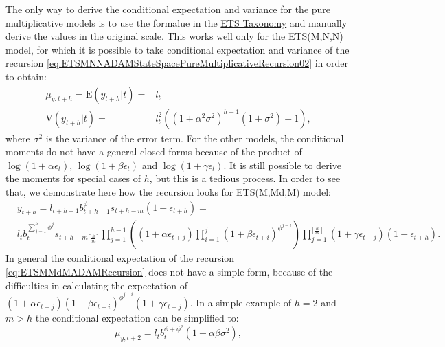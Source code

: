 \documentclass[
]{book}
\theoremstyle{definition}
\theoremstyle{definition}
\theoremstyle{definition}
\theoremstyle{definition}
\theoremstyle{remark}
\begin{document}
The only way to derive the conditional expectation and variance for the pure multiplicative models is to use the formalue in the \protect\hyperlink{ETSTaxonomyMaths}{ETS Taxonomy} and manually derive the values in the original scale. This works well only for the ETS(M,N,N) model, for which it is possible to take conditional expectation and variance of the recursion \eqref{eq:ETSMNNADAMStateSpacePureMultiplicativeRecursion02} in order to obtain:
\begin{equation}
    \begin{aligned}
        \mu_{y,t+h} = \mathrm{E}(y_{t+h}|t) = & l_{t} \\
        \mathrm{V}(y_{t+h}|t) = & l_{t}^2 \left(  \left(1+ \alpha^2 \sigma^2 \right)^{h-1} (1 + \sigma^2) - 1 \right),
    \end{aligned}
    \label{eq:ETSMNNADAMConditionalValues}
\end{equation}
where \(\sigma^2\) is the variance of the error term. For the other models, the conditional moments do not have a general closed forms because of the product of \(\log(1+\alpha\epsilon_t)\), \(\log(1+\beta\epsilon_t)\) and \(\log(1+\gamma\epsilon_t)\). It is still possible to derive the moments for special cases of \(h\), but this is a tedious process. In order to see that, we demonstrate here how the recursion looks for ETS(M,Md,M) model:
\begin{equation}
    \begin{aligned}
        & y_{t+h} = l_{t+h-1} b_{t+h-1}^\phi s_{t+h-m} \left(1 + \epsilon_{t+h} \right) = \\
        & l_{t} b_{t}^{\sum_{j=1}^h{\phi^j}} s_{t+h-m\lceil\frac{h}{m}\rceil} \prod_{j=1}^{h-1} \left( (1 + \alpha \epsilon_{t+j}) \prod_{i=1}^{j} (1 + \beta \epsilon_{t+i})^{\phi^{j-i}} \right) \prod_{j=1}^{\lceil\frac{h}{m}\rceil} \left(1 + \gamma \epsilon_{t+j}\right) \left(1 + \epsilon_{t+h} \right) .
    \end{aligned}
    \label{eq:ETSMMdMADAMRecursion}
\end{equation}
In general the conditional expectation of the recursion \eqref{eq:ETSMMdMADAMRecursion} does not have a simple form, because of the difficulties in calculating the expectation of \((1 + \alpha \epsilon_{t+j})(1 + \beta \epsilon_{t+i})^{\phi^{j-i}}(1 + \gamma \epsilon_{t+j})\). In a simple example of \(h=2\) and \(m>h\) the conditional expectation can be simplified to:
\begin{equation}
    \mu_{y,t+2} = l_{t} b_{t}^{\phi+\phi^2} \left(1 + \alpha \beta \sigma^2 \right),
    \label{eq:ETSMMdMADAMRecursionHorizon2}
\end{equation}
\end{document}
